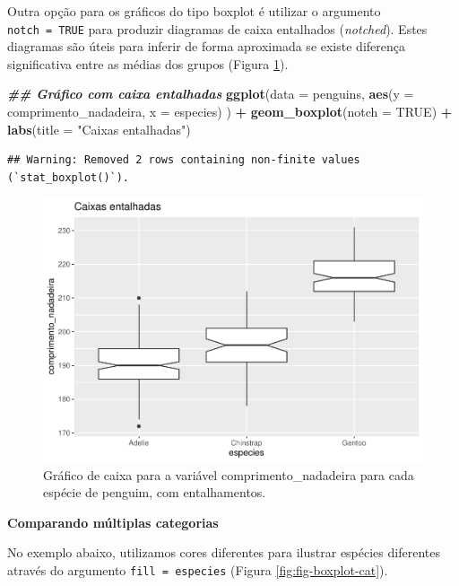 \documentclass[
]{article}
\newenvironment{Shaded}{\begin{snugshade}}{\end{snugshade}}
\newcommand{\AttributeTok}[1]{\textcolor[rgb]{0.13,0.29,0.53}{#1}}
\newcommand{\ConstantTok}[1]{\textcolor[rgb]{0.56,0.35,0.01}{#1}}
\newcommand{\DocumentationTok}[1]{\textcolor[rgb]{0.56,0.35,0.01}{\textbf{\textit{#1}}}}
\newcommand{\FunctionTok}[1]{\textcolor[rgb]{0.13,0.29,0.53}{\textbf{#1}}}
\newcommand{\NormalTok}[1]{#1}
\newcommand{\SpecialCharTok}[1]{\textcolor[rgb]{0.81,0.36,0.00}{\textbf{#1}}}
\newcommand{\StringTok}[1]{\textcolor[rgb]{0.31,0.60,0.02}{#1}}
\begin{document}
Outra opção para os gráficos do tipo boxplot é utilizar o argumento \texttt{notch\ =\ TRUE} para produzir diagramas de caixa entalhados (\emph{notched}). Estes diagramas são úteis para inferir de forma aproximada se existe diferença significativa entre as médias dos grupos (Figura \ref{fig:fig-boxplot-notched}).

\begin{Shaded}
\begin{Highlighting}[]
\DocumentationTok{\#\# Gráfico com caixa entalhadas}
\FunctionTok{ggplot}\NormalTok{(}\AttributeTok{data =}\NormalTok{ penguins, }
       \FunctionTok{aes}\NormalTok{(}\AttributeTok{y =}\NormalTok{ comprimento\_nadadeira, }\AttributeTok{x =}\NormalTok{ especies)}
\NormalTok{       ) }\SpecialCharTok{+}
    \FunctionTok{geom\_boxplot}\NormalTok{(}\AttributeTok{notch =} \ConstantTok{TRUE}\NormalTok{) }\SpecialCharTok{+}
    \FunctionTok{labs}\NormalTok{(}\AttributeTok{title =} \StringTok{"Caixas entalhadas"}\NormalTok{)}
\end{Highlighting}
\end{Shaded}

\begin{verbatim}
## Warning: Removed 2 rows containing non-finite values (`stat_boxplot()`).
\end{verbatim}

\begin{figure}
\includegraphics[width=0.75\linewidth,height=0.75\textheight]{epr_files/figure-latex/fig-boxplot-notched-1} \caption{Gráfico de caixa para a variável comprimento_nadadeira para cada espécie de penguim, com entalhamentos.}\label{fig:fig-boxplot-notched}
\end{figure}

\textbf{Comparando múltiplas categorias}

No exemplo abaixo, utilizamos cores diferentes para ilustrar espécies diferentes através do argumento \texttt{fill\ =\ especies} (Figura \ref{fig:fig-boxplot-cat}).
\end{document}

